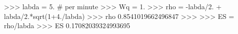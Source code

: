 
>>> labda = 5. # per minute
>>> Wq = 1.
>>> rho = -labda/2. + labda/2.*sqrt(1+4./labda)
>>> rho
0.8541019662496847
>>>
>>> ES = rho/labda
>>> ES
0.17082039324993695

